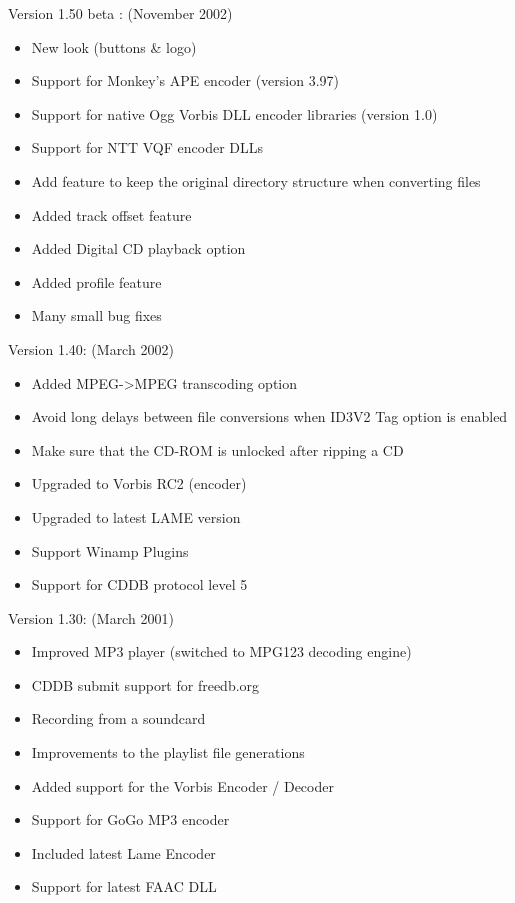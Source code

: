 Version 1.50 beta : (November 2002)

\begin{itemize}
\itemsep=0pt
\item New look (buttons & logo)
\item Support for Monkey's APE encoder (version 3.97)
\item Support for native Ogg Vorbis DLL encoder libraries (version 1.0)
\item Support for NTT VQF encoder DLLs
\item Add feature to keep the original directory structure when converting files
\item Added track offset feature
\item Added Digital CD playback option
\item Added profile feature
\item Many small bug fixes
\end{itemize}


Version 1.40: (March 2002)

\begin{itemize}
\itemsep=0pt
\item Added MPEG->MPEG transcoding option
\item Avoid long delays between file conversions when ID3V2 Tag option is enabled
\item Make sure that the CD-ROM is unlocked after ripping a CD
\item Upgraded to Vorbis RC2 (encoder)
\item Upgraded to latest LAME version
\item Support Winamp Plugins
\item Support for CDDB protocol level 5
\end{itemize}


Version 1.30: (March 2001)

\begin{itemize}
\itemsep=0pt
\item Improved MP3 player (switched to MPG123 decoding engine)
\item CDDB submit support for freedb.org
\item Recording from a soundcard
\item Improvements to the playlist file generations
\item Added support for the Vorbis Encoder / Decoder
\item Support for GoGo MP3 encoder
\item Included latest Lame Encoder
\item Support for latest FAAC DLL
\end{itemize}

